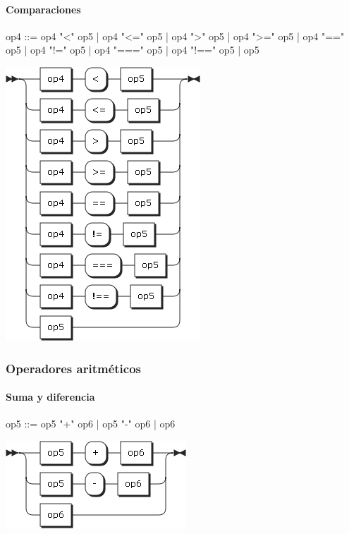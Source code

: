 \paragraph{Comparaciones}
\begin{multicols}{2}
\begin{myverbatim}      
op4 ::=  op4 "<" op5
      |  op4 "<=" op5
      |  op4 ">" op5
      |  op4 ">=" op5
      |  op4 "==" op5
      |  op4 "!=" op5
      |  op4 "===" op5
      |  op4 "!==" op5
      |  op5
\end{myverbatim}  
\columnbreak	
\begin{center}
\includegraphics[scale=0.5]{diagram/op4.png} \\
\end{center}
\end{multicols}

\subsubsection{Operadores aritméticos}
\paragraph{Suma y diferencia}
\begin{multicols}{2}
\begin{myverbatim}      
op5 ::= op5 "+" op6
      |  op5  "-" op6
      |  op6
\end{myverbatim}  
\columnbreak	
\begin{center}
\includegraphics[scale=0.5]{diagram/op5.png} \\
\end{center}
\end{multicols}

